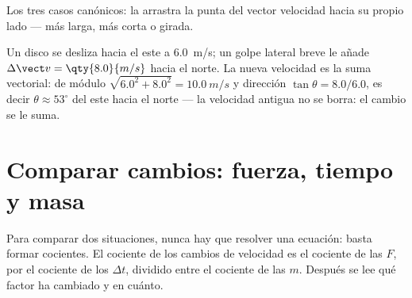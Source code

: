 \begin{omfigure}
\qquad
{}
\qquad
{}

{\small Los tres casos canónicos: la  arrastra la punta del
vector velocidad hacia su propio lado --- más larga, más corta o
girada.}
\end{omfigure}

\begin{example}\label{ex:g11:forces-and-motion:kick}
Un disco se desliza hacia el este a \qty{6.0}{m/s}; un golpe lateral
breve le añade $\Delta\vect v = \qty{8.0}{m/s}$ hacia el norte. La nueva
velocidad es la suma vectorial: de módulo
$\sqrt{6.0^2 + 8.0^2} = \qty{10.0}{m/s}$ y dirección
$\tan\theta = 8.0/6.0$, es decir $\theta \approx 53^\circ$ del este
hacia el norte --- la velocidad antigua no se borra: el cambio se le
suma.
\end{example}

\section{Comparar cambios: fuerza, tiempo y masa}

\begin{method}\label{met:g11:forces-and-motion:ratio}
Para comparar dos situaciones, nunca hay que resolver una ecuación:
basta formar cocientes. El cociente de los cambios de velocidad es el
cociente de las $F$, por el cociente de los $\Delta t$, dividido entre
el cociente de las $m$. Después se lee qué factor ha cambiado y en
cuánto.
\end{method}

